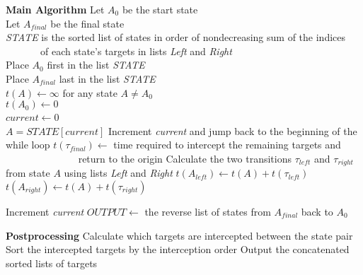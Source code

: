 \documentclass{scrartcl}
\begin{document}
{\begin{minipage}{1\linewidth}
\begin{algorithm}[H]
\begin{algorithmic}
\State \textbf{Main Algorithm}
\State Let $A_0$ be the start state \\
Let $A_{final}$ be the final state \\
\emph{STATE} is the sorted list of states in order of nondecreasing sum of the indices \\
~~~~~~~of each state's targets in lists \emph{Left} and \emph{Right}\\
Place $A_0$ first in the list \emph{STATE} \\
Place $A_{final}$ last in the list \emph{STATE} \\
$t(A) \leftarrow \infty$ for any state $A\neq A_0$  \\
$t(A_0)\leftarrow0 $\\
$current \leftarrow 0$
~\\
\State $A=STATE[current]$
\State Increment \emph{current} and jump back to the beginning of the while loop
\EndIf
{}
\State $t(\tau_{final})\leftarrow$ time required to intercept the remaining targets and
\State ~~~~~~~~~~~~~~ return to the origin
\Else
\State Calculate the two transitions $\tau_{left}$ and $\tau_{right}$ from state $A$ using lists \emph{Left} and \emph{Right}
\State $t(A_{left}) \leftarrow t(A) + t(\tau_{left})$
\EndIf
{}
\State $t(A_{right}) \leftarrow t(A) + t(\tau_{right})$
\EndIf

\EndIf
\State Increment \emph{current}
\EndWhile
\State $OUTPUT \leftarrow$ the reverse list of states from $A_{final}$ back to $A_0$

\State \textbf{Postprocessing}
\State Calculate which targets are intercepted between the state pair 
\State Sort the intercepted targets by the interception order
\EndFor
\State Output the concatenated sorted lists of targets
\end{algorithmic}
\end{algorithm}
\end{minipage}
}
\end{document}
